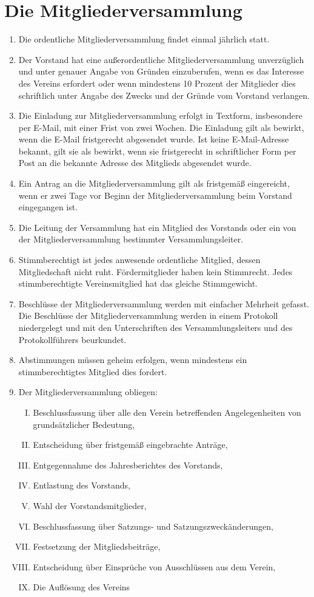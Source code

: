 \documentclass[12pt,a4paper,titlepage]{scrartcl}
\begin{document}
\section{Die Mitgliederversammlung}
\begin{enumerate}
\item Die ordentliche Mitgliederversammlung findet einmal jährlich statt.
\item Der Vorstand hat eine außerordentliche Mitgliederversammlung unverzüglich und unter genauer Angabe von Gründen einzuberufen, wenn es das Interesse des Vereins erfordert oder wenn mindestens 10 Prozent der Mitglieder dies schriftlich unter Angabe des Zwecks und der Gründe vom Vorstand verlangen.
\item Die Einladung zur Mitgliederversammlung erfolgt in Textform, insbesondere per E-Mail, mit einer Frist von zwei Wochen. Die Einladung gilt als bewirkt, wenn die E-Mail fristgerecht abgesendet wurde. Ist keine E-Mail-Adresse bekannt, gilt sie als bewirkt, wenn sie fristgerecht in schriftlicher Form per Post an die bekannte Adresse des Mitglieds abgesendet wurde.
\item Ein Antrag an die Mitgliederversammlung gilt als fristgemäß eingereicht, wenn er zwei Tage vor Beginn der Mitgliederversammlung beim Vorstand eingegangen ist.
\item Die Leitung der Versammlung hat ein Mitglied des Vorstands oder ein von der Mitgliederversammlung bestimmter Versammlungsleiter.
\item Stimmberechtigt ist jedes anwesende ordentliche Mitglied, dessen Mitgliedschaft nicht ruht. Fördermitglieder haben kein Stimmrecht. Jedes stimmberechtigte Vereinsmitglied hat das gleiche Stimmgewicht.
\item  Beschlüsse der Mitgliederversammlung werden mit einfacher Mehrheit gefasst. Die Beschlüsse der Mitgliederversammlung werden in einem Protokoll niedergelegt und mit den Unterschriften des Versammlungsleiters und des Protokollführers beurkundet.
\item Abstimmungen müssen geheim erfolgen, wenn mindestens ein stimmberechtigtes Mitglied dies fordert.
\item Der Mitgliederversammlung obliegen:
\begin{enumerate}[I.]
\item Beschlussfassung über alle den Verein betreffenden Angelegenheiten von grundsätzlicher Bedeutung,
\item Entscheidung über fristgemäß eingebrachte Anträge,
\item Entgegennahme des Jahresberichtes des Vorstands,
\item Entlastung des Vorstands,
\item Wahl der Vorstandsmitglieder,
\item Beschlussfassung über Satzungs- und Satzungszweckänderungen,
\item Festsetzung der Mitgliedsbeiträge,
\item Entscheidung über Einsprüche von Ausschlüssen aus dem Verein,
\item Die Auflösung des Vereins
\end{enumerate}
\end{enumerate}
\end{document}
